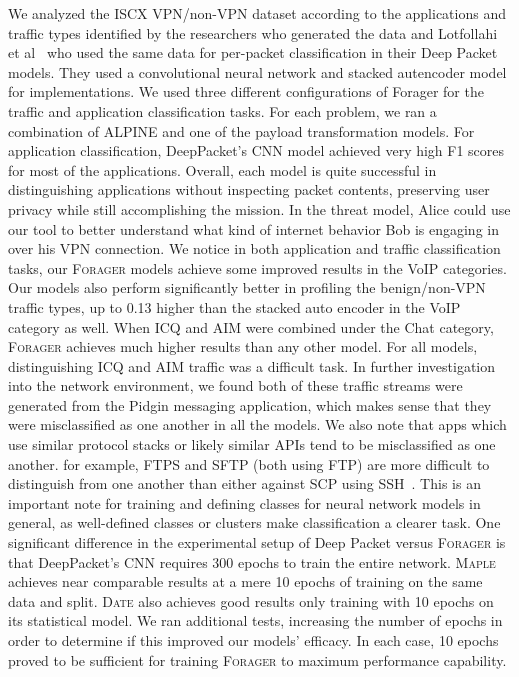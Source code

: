 We analyzed the ISCX VPN/non-VPN dataset according to the applications and traffic types identified by the researchers who generated the data and Lotfollahi et al~\cite{deeppacket} who used the same data for per-packet classification in their Deep Packet models. They used a convolutional neural network and stacked autencoder model for implementations. We used three different configurations of Forager for the traffic and application classification tasks. For each problem, we ran a combination of ALPINE and one of the payload transformation models. For application classification, DeepPacket's CNN model achieved very high F1 scores for most of the applications. Overall, each model is quite successful in distinguishing applications without inspecting packet contents, preserving user privacy while still accomplishing the mission. In the threat model, Alice could use our tool to better understand what kind of internet behavior Bob is engaging in over his VPN connection. We notice in both application and traffic classification tasks, our \textsc{Forager} models achieve some improved results in the VoIP categories. Our models also perform significantly better in profiling the benign/non-VPN traffic types, up to 0.13 higher than the stacked auto encoder in the VoIP category as well. When ICQ and AIM were combined under the Chat category, \textsc{Forager} achieves much higher results than any other model. For all models, distinguishing ICQ and AIM traffic was a difficult task. In further investigation into the network environment, we found both of these traffic streams were generated from the Pidgin messaging application, which makes sense that they were misclassified as one another in all the models. We also note that apps which use similar protocol stacks or likely similar APIs tend to be misclassified as one another. for example, FTPS and SFTP (both using FTP) are more difficult to distinguish from one another than either against SCP using SSH~\cite{deeppacket}. This is an important note for training and defining classes for neural network models in general, as well-defined classes or clusters make classification a clearer task. One significant difference in the experimental setup of Deep Packet versus \textsc{Forager} is that DeepPacket's CNN requires 300 epochs to train the entire network. \textsc{Maple} achieves near comparable results at a mere 10 epochs of training on the same data and split. \textsc{Date} also achieves good results only training with 10 epochs on its statistical model. We ran additional tests, increasing the number of epochs in order to determine if this improved our models' efficacy. In each case, 10 epochs proved to be sufficient for training \textsc{Forager} to maximum performance capability.

